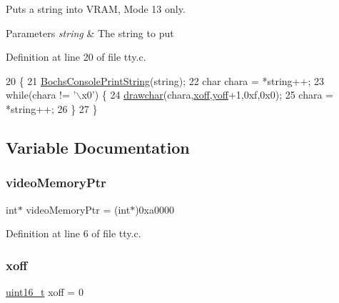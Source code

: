 Puts a string into V\+R\+AM, Mode 13 only. 


\begin{DoxyParams}{Parameters}
{\em string} & The string to put \\
\hline
\end{DoxyParams}


Definition at line 20 of file tty.\+c.


\begin{DoxyCode}
20                                     \{
21     \hyperlink{a00017_a19e1f554d03c977f8b947f21489daa41_a19e1f554d03c977f8b947f21489daa41}{BochsConsolePrintString}(\textcolor{keywordtype}{string});
22     \textcolor{keywordtype}{char} chara = *\textcolor{keywordtype}{string}++;
23     \textcolor{keywordflow}{while}(chara != \textcolor{stringliteral}{'\(\backslash\)x0'}) \{
24         \hyperlink{a00008_a2c8df7a20b47341b70d97a7ff21d86ea_a2c8df7a20b47341b70d97a7ff21d86ea}{drawchar}(chara,\hyperlink{a00080_abaa0d20f0e52ce0d3a7d706f6ac16266_abaa0d20f0e52ce0d3a7d706f6ac16266}{xoff},\hyperlink{a00080_a1a7539764d0ae8cd06ce45c62cf92bca_a1a7539764d0ae8cd06ce45c62cf92bca}{yoff}+1,0xf,0x0);
25         chara = *\textcolor{keywordtype}{string}++;
26     \}
27 \}
\end{DoxyCode}


\subsection{Variable Documentation}
\mbox{\label{a00080_a3f896e9c00b9302e2287aad054199134_a3f896e9c00b9302e2287aad054199134}} 
\subsubsection{\texorpdfstring{video\+Memory\+Ptr}{videoMemoryPtr}}
{\footnotesize\ttfamily int$\ast$ video\+Memory\+Ptr = (int$\ast$)0xa0000}



Definition at line 6 of file tty.\+c.

\mbox{\label{a00080_abaa0d20f0e52ce0d3a7d706f6ac16266_abaa0d20f0e52ce0d3a7d706f6ac16266}} 
\subsubsection{\texorpdfstring{xoff}{xoff}}
{\footnotesize\ttfamily \hyperlink{a00068_a273cf69d639a59973b6019625df33e30_a273cf69d639a59973b6019625df33e30}{uint16\+\_\+t} xoff = 0}



